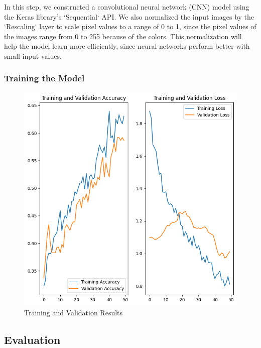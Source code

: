 In this step, we constructed a convolutional neural network (CNN) model using the Keras library's `Sequential` API. We also normalized the input images by the `Rescaling` layer to scale pixel values to a range of 0 to 1, since the pixel values of the images range from 0 to 255 because of the colors. This normalization will help the model learn more efficiently, since neural networks perform better with small input values.


\subsubsection{Training the Model}



\begin{figure}[H]
  \includegraphics[width=\linewidth]{figures/training_validation_results.png}
  \caption{Training and Validation Results}
  \label{fig:results}
\end{figure}

\subsection{Evaluation}

